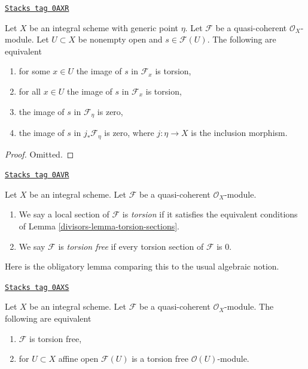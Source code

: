 \begin{lemma}
\label{divisors-lemma-torsion-sections}
\href{https://stacks.math.columbia.edu/tag/0AXR}{\texttt{Stacks tag 0AXR}}

Let $X$ be an integral scheme with generic point $\eta$. Let $\mathcal{F}$
be a quasi-coherent $\mathcal{O}_X$-module. Let $U \subset X$ be nonempty
open and $s \in \mathcal{F}(U)$. The following are equivalent
\begin{enumerate}
\item for some $x \in U$ the image of $s$ in $\mathcal{F}_x$ is torsion,
\item for all $x \in U$ the image of $s$ in $\mathcal{F}_x$ is torsion,
\item the image of $s$ in $\mathcal{F}_\eta$ is zero,
\item the image of $s$ in $j_*\mathcal{F}_\eta$ is zero, where $j : \eta \to X$
is the inclusion morphism.
\end{enumerate}
\end{lemma}

\begin{proof}
Omitted.
\end{proof}

\begin{definition}[Torsion]
\label{divisors-definition-torsion}
\href{https://stacks.math.columbia.edu/tag/0AVR}{\texttt{Stacks tag 0AVR}}

Let $X$ be an integral scheme. Let $\mathcal{F}$ be a quasi-coherent
$\mathcal{O}_X$-module.
\begin{enumerate}
\item We say a local section of $\mathcal{F}$ is {\it torsion}
if it satisfies the equivalent conditions of Lemma \ref{divisors-lemma-torsion-sections}.
\item We say $\mathcal{F}$ is {\it torsion free} if every torsion section
of $\mathcal{F}$ is $0$.
\end{enumerate}
\end{definition}

Here is the obligatory lemma comparing this to the usual algebraic notion.

\begin{lemma}
\label{divisors-lemma-check-torsion-on-affines}
\href{https://stacks.math.columbia.edu/tag/0AXS}{\texttt{Stacks tag 0AXS}}

Let $X$ be an integral scheme. Let $\mathcal{F}$ be a quasi-coherent
$\mathcal{O}_X$-module. The following are equivalent
\begin{enumerate}
\item $\mathcal{F}$ is torsion free,
\item for $U \subset X$ affine open $\mathcal{F}(U)$
is a torsion free $\mathcal{O}(U)$-module.
\end{enumerate}
\end{lemma}

